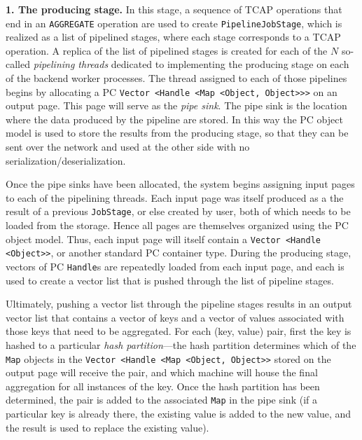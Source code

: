 \vspace{5pt}
{\bf 1. The producing stage.} In this stage, a sequence of TCAP
operations that end in an \texttt{AGGREGATE} operation are used to
create \texttt{PipelineJobStage}, which is 
realized as a list
of pipelined stages, where each stage corresponds to a TCAP operation.
A replica of the list of pipelined stages is
created for each of the $N$ so-called \emph{pipelining threads} dedicated to implementing
the producing stage on each of the backend worker processes.  
The thread assigned to each of those pipelines begins by allocating a PC \texttt{Vector <Handle <Map <Object, Object}\texttt{>}\texttt{>}\texttt{>} on an output page.  This page will serve
as the \emph{pipe sink}.  The pipe sink is
the location where the data produced by the pipeline are stored.  In
this way the PC object model is used to store the results
from the producing stage, so that they can be sent over the network and used at the other side with no serialization/deserialization.

Once the pipe sinks have been allocated,
the system begins assigning input pages to each of the pipelining 
threads.  Each input page was itself produced as a the result of a
previous \texttt{JobStage}, or else created by user, both of which needs to be
loaded from the storage.  Hence all pages are themselves organized using the PC object model.  Thus, each input
page will itself contain a \texttt{Vector <Handle <Object}\texttt{>}\texttt{>},
or another standard PC container type.  During the producing stage, vectors of PC \texttt{Handle}s are repeatedly
loaded from each input page, and each is used to create a vector list that is pushed through the list of pipeline stages.

Ultimately, pushing a vector list through the pipeline stages results in an output vector list that contains a vector of keys and a vector of values 
associated with those keys that need to be aggregated.  
For each (key, value)
pair, first the key is hashed to a particular \emph{hash partition}---the hash partition determines which of the \texttt{Map}
objects in the \texttt{Vector <Handle <Map <Object, Object}\texttt{>}\texttt{>} stored on the output page will receive the pair, and which machine will house the final aggregation
for all instances of the key.  Once the hash partition has been determined,
the pair is added to the associated \texttt{Map} in the pipe sink
(if a particular key is already there, the
existing value is added to the new value, and the result is used to replace the existing value).  

